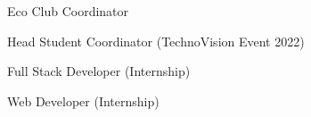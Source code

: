 \documentclass[]{deedy-resume-openfont}
\begin{document}
\begin{minipage}[t]{0.55\textwidth}
\begin{tightemize}
\item Eco Club Coordinator
\end{tightemize}
\hspace{\topsep}

\begin{tightemize}
\item Head Student Coordinator (TechnoVision Event 2022)
\end{tightemize}
\hspace{\topsep}

\sectionsep

\sectionsep


\begin{tightemize}
\item Full Stack Developer (Internship)
\end{tightemize}
\hspace{\topsep}

\begin{tightemize}
\item Web Developer (Internship)
\end{tightemize}
\hspace{\topsep}

\sectionsep


\end{minipage} 
\end{document}
